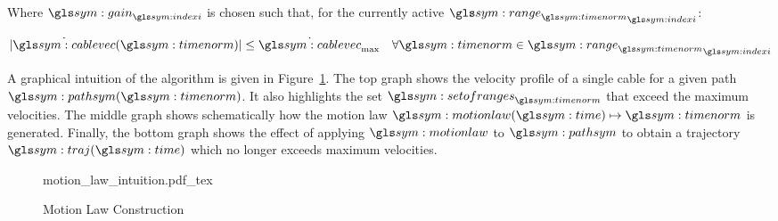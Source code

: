 		Where $\gain_{\indexi}$ is chosen such that, for the currently active
		${\rangetimenorm}_{\indexi}$:

		\begin{equation}
			\abs
			{%
				\dot{\cablevec}(\timenorm)
			}
			\leq \dot{\cablevec}_{\max}
			\quad\forall{\timenorm}\in{\rangetimenorm}_{\indexi}
		\end{equation}

		A graphical intuition of the algorithm is given in
		Figure~\ref{fig:motion_law_graphical_intuition}. The top graph shows the
		velocity profile of a single cable for a given path
		$\pathsym(\timenorm)$. It also highlights the set $\setofrangestimenorm$
		that exceed the maximum velocities. The middle graph shows schematically
		how the motion law $\motionlaw(\timesym) \mapsto \timenorm$ is
		generated. Finally, the bottom graph shows the effect of applying
		$\motionlaw$ to $\pathsym$ to obtain a trajectory $\traj(\timesym)$
		which no longer exceeds maximum velocities.

		\begin{figure}[hb]
			\centering
			\def\svgheight{8cm}
			{motion_law_intuition.pdf_tex}
			\caption{Motion Law Construction}%
			\label{fig:motion_law_graphical_intuition}
		\end{figure}


